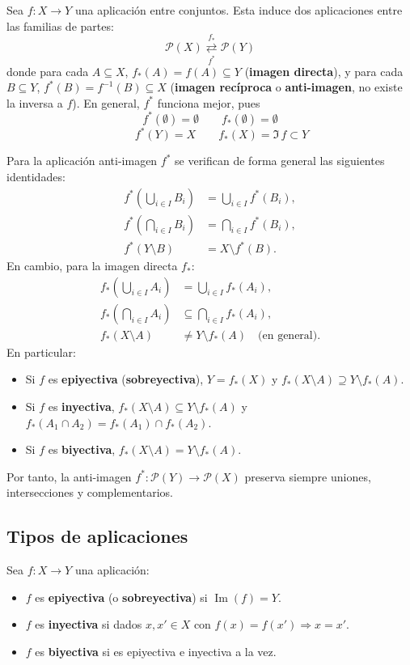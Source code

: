 Sea $f \colon X \to Y$ una aplicación entre conjuntos. Esta induce dos aplicaciones entre las familias de partes:
\[
    \mathcal{P}(X) \underset{f^*}{\overset{f_*}{\rightleftarrows}} \mathcal{P}(Y)
\]
donde para cada $A \subseteq X$, $f_*(A) = f(A) \subseteq Y$ (\textbf{imagen directa}), y para cada $B \subseteq Y$, $f^*(B) = f^{-1}(B) \subseteq X$ (\textbf{imagen recíproca} o \textbf{anti-imagen}, no existe la inversa a $f$). En general, $f^*$ funciona mejor, pues
$$f^*(\emptyset) = \emptyset \qquad f_*(\emptyset) = \emptyset$$
$$\qquad f^*(Y) = X \qquad f_*(X) = \Im\, f \subset Y$$
\begin{propi}
Para la aplicación anti-imagen $f^*$ se verifican de forma general las siguientes identidades:
\begin{align*}
    f^*\left(\bigcup_{i \in I} B_i\right) &= \bigcup_{i \in I} f^*(B_i), \\
    f^*\left(\bigcap_{i \in I} B_i\right) &= \bigcap_{i \in I} f^*(B_i), \\
    f^*(Y \setminus B) &= X \setminus f^*(B).
\end{align*}
En cambio, para la imagen directa $f_*$:
\begin{align*}
    f_*\left(\bigcup_{i \in I} A_i\right) &= \bigcup_{i \in I} f_*(A_i), \\
    f_*\left(\bigcap_{i \in I} A_i\right) &\subseteq \bigcap_{i \in I} f_*(A_i), \\
    f_*(X \setminus A) &\ne Y \setminus f_*(A) \quad \text{(en general)}.
\end{align*}
En particular:
\begin{itemize}
    \item Si $f$ es \textbf{epiyectiva} (\textbf{sobreyectiva}), $Y = f_*(X)$ y $f_*(X \setminus A) \supseteq Y \setminus f_*(A)$.
    \item Si $f$ es \textbf{inyectiva}, $f_*(X \setminus A) \subseteq Y \setminus f_*(A)$ y $f_*(A_1 \cap A_2) = f_*(A_1) \cap f_*(A_2)$.
    \item Si $f$ es \textbf{biyectiva}, $f_*(X \setminus A) = Y \setminus f_*(A)$.
\end{itemize}
Por tanto, la anti-imagen $f^* \colon \mathcal{P}(Y) \to \mathcal{P}(X)$ preserva siempre uniones, intersecciones y complementarios.
\end{propi}


\subsection*{Tipos de aplicaciones}
Sea $f \colon X \to Y$ una aplicación:
\begin{itemize}
    \item $f$ es \textbf{epiyectiva} (o \textbf{sobreyectiva}) si $\operatorname{Im}(f) = Y$.
    \item $f$ es \textbf{inyectiva} si dados $x, x' \in X$ con $f(x) = f(x') \Rightarrow x = x'$.
    \item $f$ es \textbf{biyectiva} si es epiyectiva e inyectiva a la vez.
\end{itemize}

